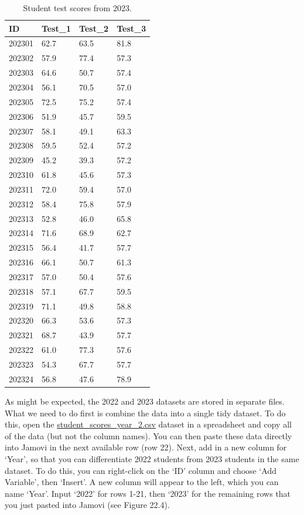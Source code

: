 \documentclass[
]{scrbook}
\begin{document}
\begin{table}

\caption{\label{tab:unnamed-chunk-102}Student test scores from 2023.}
\centering
\begin{tabular}[t]{l|l|l|l}
\hline
ID & Test\_1 & Test\_2 & Test\_3\\
\hline
202301 & 62.7 & 63.5 & 81.8\\
\hline
202302 & 57.9 & 77.4 & 57.3\\
\hline
202303 & 64.6 & 50.7 & 57.4\\
\hline
202304 & 56.1 & 70.5 & 57.0\\
\hline
202305 & 72.5 & 75.2 & 57.4\\
\hline
202306 & 51.9 & 45.7 & 59.5\\
\hline
202307 & 58.1 & 49.1 & 63.3\\
\hline
202308 & 59.5 & 52.4 & 57.2\\
\hline
202309 & 45.2 & 39.3 & 57.2\\
\hline
202310 & 61.8 & 45.6 & 57.3\\
\hline
202311 & 72.0 & 59.4 & 57.0\\
\hline
202312 & 58.4 & 75.8 & 57.9\\
\hline
202313 & 52.8 & 46.0 & 65.8\\
\hline
202314 & 71.6 & 68.9 & 62.7\\
\hline
202315 & 56.4 & 41.7 & 57.7\\
\hline
202316 & 66.1 & 50.7 & 61.3\\
\hline
202317 & 57.0 & 50.4 & 57.6\\
\hline
202318 & 57.1 & 67.7 & 59.5\\
\hline
202319 & 71.1 & 49.8 & 58.8\\
\hline
202320 & 66.3 & 53.6 & 57.3\\
\hline
202321 & 68.7 & 43.9 & 57.7\\
\hline
202322 & 61.0 & 77.3 & 57.6\\
\hline
202323 & 54.3 & 67.7 & 57.7\\
\hline
202324 & 56.8 & 47.6 & 78.9\\
\hline
\end{tabular}
\end{table}

As might be expected, the 2022 and 2023 datasets are stored in separate files.
What we need to do first is combine the data into a single tidy dataset.
To do this, open the \href{https://raw.githubusercontent.com/bradduthie/statistical_techniques/main/data/student_scores_year_2.csv}{student\_scores\_year\_2.csv} dataset in a spreadsheet and copy all of the data (but not the column names).
You can then paste these data directly into Jamovi in the next available row (row 22).
Next, add in a new column for `Year', so that you can differentiate 2022 students from 2023 students in the same dataset.
To do this, you can right-click on the `ID' column and choose `Add Variable', then `Insert'.
A new column will appear to the left, which you can name `Year'.
Input `2022' for rows 1-21, then `2023' for the remaining rows that you just pasted into Jamovi (see Figure 22.4).
\end{document}
